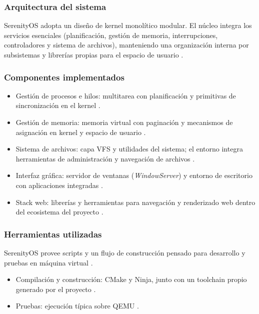 \subsubsection{Arquitectura del sistema}
SerenityOS adopta un diseño de kernel monolítico modular. El núcleo integra los servicios esenciales (planificación, gestión de memoria, interrupciones, controladores y sistema de archivos), manteniendo una organización interna por subsistemas y librerías propias para el espacio de usuario \cite{serenity_arch}.

\subsubsection{Componentes implementados}
\begin{itemize}
    \item Gestión de procesos e hilos: multitarea con planificación y primitivas de sincronización en el kernel \cite{serenity_arch}.
    \item Gestión de memoria: memoria virtual con paginación y mecanismos de asignación en kernel y espacio de usuario \cite{serenity_arch}.
    \item Sistema de archivos: capa VFS y utilidades del sistema; el entorno integra herramientas de administración y navegación de archivos \cite{serenity_arch}.
    \item Interfaz gráfica: servidor de ventanas (\textit{WindowServer}) y entorno de escritorio con aplicaciones integradas \cite{serenity_arch}.
    \item Stack web: librerías y herramientas para navegación y renderizado web dentro del ecosistema del proyecto \cite{serenityos:github, serenity_arch}.
\end{itemize}

\subsubsection{Herramientas utilizadas}
SerenityOS provee scripts y un flujo de construcción pensado para desarrollo y pruebas en máquina virtual \cite{serenity_arch}.

\begin{itemize}
    \item Compilación y construcción: CMake y Ninja, junto con un toolchain propio generado por el proyecto \cite{serenity_arch}.
    \item Pruebas: ejecución típica sobre QEMU \cite{serenity_arch}.
\end{itemize}

